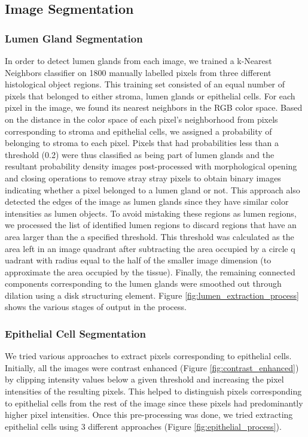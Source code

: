 \subsection{Image Segmentation}

\subsubsection{Lumen Gland Segmentation}

In order to detect lumen glands from each image, we trained a k-Nearest Neighbors classifier on 1800 manually labelled pixels from three different histological object regions. This training set consisted of an equal number of pixels that belonged to either stroma, lumen glands or epithelial cells. For each pixel in the image, we found its nearest neighbors in the RGB color space. Based on the distance in the color space of each pixel's neighborhood from pixels corresponding to stroma and epithelial cells, we assigned a probability of belonging to stroma to each pixel. Pixels that had probabilities less than a threshold (0.2) were thus classified as being part of lumen glands and the resultant probability density images post-processed with morphological opening and closing operations to remove stray stray pixels to obtain binary images indicating whether a pixel belonged to a lumen gland or not. This approach also detected the edges of the image as lumen glands since they have similar color intensities as lumen objects. To avoid mistaking these regions as lumen regions, we processed the list of identified lumen regions to discard regions that have
an area larger than the a specified threshold. This threshold was calculated as the area left in an image
quadrant after subtracting the area occupied by a circle q
uadrant with radius equal to the half of the smaller image dimension (to approximate the area occupied by the tissue). Finally, the remaining connected components corresponding to the lumen glands were smoothed out through dilation using a disk structuring element. Figure \ref{fig:lumen_extraction_process} shows the various stages of output in the process.

\subsubsection{Epithelial Cell Segmentation}

We tried various approaches to extract pixels corresponding to epithelial cells. Initially, all the images were contrast enhanced (Figure \ref{fig:contrast_enhanced}) by clipping intensity values below a given threshold and increasing the pixel intensities of the resulting pixels. This helped to distinguish pixels corresponding to epithelial cells from the rest of the image since these pixels had predominantly higher pixel intensities. Once this pre-processing was done, we tried extracting epithelial cells using 3 different approaches (Figure \ref{fig:epithelial_process}).

